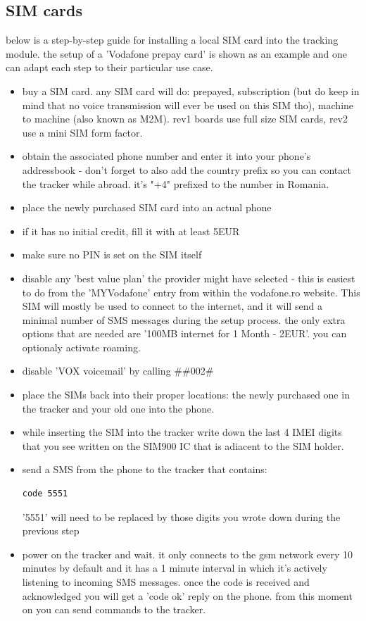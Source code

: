 \documentclass[a4paper,twoside]{refart}
\begin{document}
\subsection{SIM cards}

below is a step-by-step guide for installing a local SIM card into the tracking module. the setup of a 'Vodafone prepay card' is shown as an example and one can adapt each step to their particular use case.

\begin{itemize}
    \item buy a SIM card. any SIM card will do: prepayed, subscription (but do keep in mind that no voice transmission will ever be used on this SIM tho), machine to machine (also known as M2M). rev1 boards use full size SIM cards, rev2 use a mini SIM form factor.
    \item obtain the associated phone number and enter it into your phone's addressbook - don't forget to also add the country prefix so you can contact the tracker while abroad. it's "+4" prefixed to the number in Romania.
    \item place the newly purchased SIM card into an actual phone
    \item if it has no initial credit, fill it with at least 5EUR
    \item make sure no PIN is set on the SIM itself
    \item disable any 'best value plan' the provider might have selected - this is easiest to do from the 'MYVodafone' entry from within the vodafone.ro website. This SIM will mostly be used to connect to the internet, and it will send a minimal number of SMS messages during the setup process. the only extra options that are needed are '100MB internet for 1 Month - 2EUR'. you can optionaly activate roaming.
    \item disable 'VOX voicemail' by calling \#\#002\#
    \item place the SIMs back into their proper locations: the newly purchased one in the tracker and your old one into the phone.
    \item while inserting the SIM into the tracker write down the last 4 IMEI digits that you see written on the SIM900 IC that is adiacent to the SIM holder.
    \item send a SMS from the phone to the tracker that contains:

\begin{lstlisting}
code 5551
\end{lstlisting}

'5551' will need to be replaced by those digits you wrote down during the previous step

    \item power on the tracker and wait. it only connects to the gsm network every 10 minutes by default and it has a 1 minute interval in which it's actively listening to incoming SMS messages. once the code is received and acknowledged you will get a 'code ok' reply on the phone. from this moment on you can send commands to the tracker.
\end{itemize}
\end{document}

